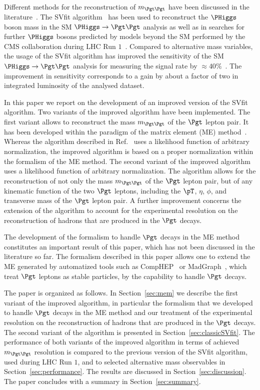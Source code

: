 Different methods for the reconstruction of $m_{\Pgt\Pgt}$ 
have been discussed in the literature~\cite{massRecoCollinearApprox,neutrinoRecByVertexInfo,MMC,Barr:2011he,Gripaios:2012th}. 
The SVfit algorithm~\cite{SVfit} has been used to reconstruct the $\PHiggs$ boson mass in the SM $\PHiggs \to \Pgt\Pgt$ analysis
as well as in searches for further $\PHiggs$ bosons predicted by models beyond the SM 
performed by the CMS collaboration during LHC Run $1$~\cite{HIG-10-002,HIG-11-029,HIG-13-004,HIG-13-021,HIG-14-029,HIG-14-033,HIG-14-034,HIG-15-001,HIG-15-013}.
Compared to alternative mass variables,
the usage of the SVfit algorithm has improved the sensitivity of the SM $\PHiggs \to \Pgt\Pgt$ analysis for measuring the signal rate by $\approx 40\%$~\cite{HIG-13-004}.
The improvement in sensitivity corresponds to a gain by about a factor of two in integrated luminosity of the analysed dataset.

In this paper we report on the development of an improved version of the SVfit algorithm.
Two variants of the improved algorithm have been implemented.
The first variant allows to reconstruct the mass $m_{\Pgt\Pgt}$ of the $\Pgt$ lepton pair.
It has been developed within the paradigm of the matrix element (ME) method~\cite{Kondo:1988yd,Kondo:1991dw}.
Whereas the algorithm described in Ref.~\cite{SVfit} uses a likelihood function of arbitrary normalization,
the improved algorithm is based on a proper normalization within the formalism of the ME method.
The second variant of the improved algorithm uses a likelihood function of arbitrary normalization.
The algorithm allows for the reconstruction of not only the mass $m_{\Pgt\Pgt}$ of the $\Pgt$ lepton pair,
but of any kinematic function of the two $\Pgt$ leptons,
including the $\pT$, $\eta$, $\phi$, and transverse mass of the $\Pgt$ lepton pair.
A further improvement concerns the extension of the algorithm to account for the experimental resolution 
on the reconstruction of hadrons that are produced in the $\Pgt$ decays.

The development of the formalism to handle $\Pgt$ decays in the ME method constitutes an important result of this paper,
which has not been discussed in the literature so far.
The formalism described in this paper allows one to extend the ME generated by automatized tools such as CompHEP~\cite{CompHEP1,CompHEP2} or MadGraph~\cite{MadGraph},
which treat $\Pgt$ leptons as stable particles, by the capability to handle $\Pgt$ decays.

The paper is organized as follows. 
In Section~\ref{sec:mem} we describe the first variant of the improved algorithm, 
in particular the formalism that we developed to handle $\Pgt$ decays in the ME method
and our treatment of the experimental resolution on the reconstruction of hadrons that are produced in the $\Pgt$ decays.
The second variant of the algorithm is presented in Section~\ref{sec:classicSVfit}.
The performance of both variants of the improved algorithm in terms of achieved $m_{\Pgt\Pgt}$ resolution 
is compared to the previous version of the SVfit algorithm, used during LHC Run $1$, 
and to selected alternative mass observables in Section~\ref{sec:performance}.
The results are discussed in Section~\ref{sec:discussion}.
The paper concludes with a summary in Section~\ref{sec:summary}.

